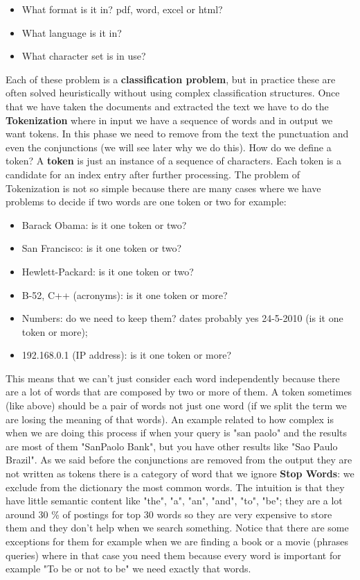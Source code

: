 \begin{itemize}
    \item What format is it in? pdf, word, excel or html?
    \item What language is it in?
    \item What character set is in use?
\end{itemize}
Each of these problem is a \textbf{classification problem}, but in practice these are often solved heuristically without using complex classification structures.\newline
Once that we have taken the documents and extracted the text we have to do the \textbf{Tokenization} where in input we have a sequence of words and in output we want tokens. In this phase we need to remove from the text the punctuation and even the conjunctions (we will see later why we do this).\newline
How do we define a token? A \textbf{token} is just an instance of a sequence of characters. Each token is a candidate for an index entry after further processing.\newline
The problem of Tokenization is not so simple because there are many cases where we have problems to decide if two words are one token or two for example:
\begin{itemize}
    \item Barack Obama: is it one token or two?
    \item San Francisco: is it one token or two?
    \item Hewlett-Packard: is it one token or two?
    \item B-52, C++ (acronyms): is it one token or more?
    \item Numbers: do we need to keep them? dates probably yes 24-5-2010 (is it one token or more);
    \item 192.168.0.1 (IP address): is it one token or more?
\end{itemize}
This means that we can't just consider each word independently because there are a lot of words that are composed by two or more of them. A token sometimes (like above) should be a pair of words not just one word (if we split the term we are losing the meaning of that words).\newline
An example related to how complex is when we are doing this process if when your query is "san paolo" and the results are most of them "SanPaolo Bank", but you have other results like "Sao Paulo Brazil".\newline
As we said before the conjunctions are removed from the output they are not written as tokens there is a category of word that we ignore \textbf{Stop Words}: we exclude from the dictionary the most common words. The intuition is that they have little semantic content like "the", "a", "an", "and", "to", "be"; they are a lot around 30 \% of postings for top 30 words so they are very expensive to store them and they don't help when we search something. Notice that there are some exceptions for them for example when we are finding a book or a movie (phrases queries) where in that case you need them because every word is important for example "To be or not to be" we need exactly that words.\newline
